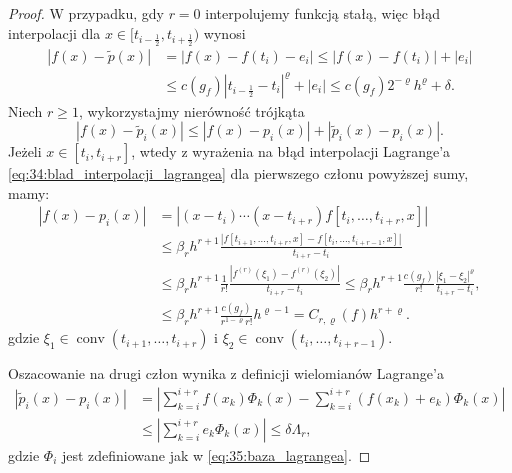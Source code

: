 \documentclass[oik, pdftex, robocza, man]{mgrwms}
\DeclareMathOperator*{\conv}{conv}
\begin{document}
    \begin{proof}
        W przypadku, gdy $r=0$ interpolujemy funkcją stałą, więc błąd interpolacji dla $x \in [t_{i - \frac{1}{2}}, t_{i + \frac{1}{2}})$ wynosi
        \begin{equation*}
            \begin{aligned}                
                |f(x) - \tilde{p}(x)| &= |f(x) - f(t_{i}) - e_{i}| \leq |f(x) - f(t_{i})| + |e_{i}| \\
                    &\leq c(g_{f}) \left|t_{i-\frac{1}{2}} - t_{i}\right|^{\varrho} + |e_{i}| \leq c(g_{f}) 2^{-\varrho}h^{\varrho} + \delta.
            \end{aligned}
        \end{equation*}
        Niech $r \geq 1$, wykorzystajmy nierówność trójkąta
        \begin{equation*}
            \left|f(x)-\tilde{p}_{i}(x)\right| \leq\left|f(x)-p_{i}(x)\right|+\left|\tilde{p}_{i}(x)-p_{i}(x)\right|.
        \end{equation*}
        Jeżeli $x \in\left[t_{i}, t_{i+r}\right]$, wtedy z wyrażenia na błąd interpolacji Lagrange'a \eqref{eq:34:blad_interpolacji_lagrangea} dla pierwszego członu powyższej sumy, mamy:
        \begin{equation} \label{eq:36}
            \begin{aligned}
                \left|f(x)-p_{i}(x)\right| &=\left|\left(x-t_{i}\right) \cdots\left(x-t_{i+r}\right) f\left[t_{i}, \ldots, t_{i+r}, x\right]\right| \\
                & \leq \beta_{r} h^{r+1} \frac{\left|f\left[t_{i+1}, \ldots, t_{i+r}, x\right]-f\left[t_{i}, \ldots, t_{i+r-1}, x\right]\right|}{t_{i+r}-t_{i}} \\
                & \leq \beta_{r} h^{r+1} \frac{1}{r!} \frac{\left|f^{(r)}(\xi_{1})-f^{(r)}(\xi_{2})\right|}{t_{i+r}-t_{i}} 
                    \leq \beta_{r} h^{r+1} \frac{c(g_{f})}{r!} \frac{\left|\xi_{1}-\xi_{2}\right|^{\varrho}}{t_{i+r}-t_{i}}, \\
                & \leq \beta_{r} h^{r+1} \frac{c\left(g_{f}\right)}{r^{1-\varrho} r !} h^{\varrho-1}=C_{r, \varrho}(f) h^{r+\varrho}.
            \end{aligned}
        \end{equation}
        gdzie $\xi_{1} \in \conv(t_{i+1}, \ldots, t_{i+r})$ i $\xi_{2} \in \conv(t_{i}, \ldots, t_{i+r-1})$.

        Oszacowanie na drugi człon wynika z definicji wielomianów Lagrange'a
        \begin{equation} \label{eq:1}
            \begin{aligned}
                \left|\tilde{p}_{i}(x)-p_{i}(x)\right| &=\left|\sum_{k=i}^{i+r} f(x_{k}) \Phi_{k}(x) - \sum_{k=i}^{i+r} (f(x_{k}) + e_{k}) \Phi_{k}(x)\right| \\
                    & \leq \left|\sum_{k=i}^{i+r} e_{k} \Phi_{k}(x)\right| \leq \delta \Lambda_{r},
            \end{aligned}
        \end{equation}
        gdzie $\Phi_{i}$ jest zdefiniowane jak w \eqref{eq:35:baza_lagrangea}.


\end{proof}
\end{document}
